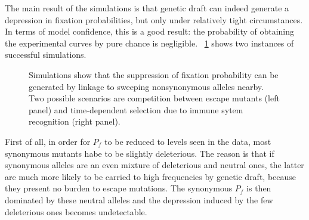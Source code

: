 \documentclass[12pt,a4paper,notitlepage,onecolumn]{article}
\begin{document}
The main result of the simulations is that genetic draft can indeed generate a
depression in fixation probabilities, but only under relatively tight
circumstances. In terms of model confidence, this is a good result: the
probability of obtaining the experimental curves by pure chance is negligible.
\figurename~\ref{fig:simfixp} shows two instances of successful simulations.
\begin{figure}
\begin{center}
\caption{Simulations show that the suppression of fixation probability can be
generated by linkage to sweeping nonsynonymous alleles nearby. Two possible
scenarios are competition between escape mutants (left panel) and time-dependent
selection due to immune sytem recognition (right panel).}
\label{fig:simfixp}
\end{center}
\end{figure}

First of all, in order for $P_f$ to be reduced to levels seen in the data, most
synonymous mutants habe to be slightly deleterious. The reason is that if
synonymous alleles are an even mixture of deleterious and neutral ones, the
latter are much more likely to be carried to high frequencies by genetic draft,
because they present no burden to escape mutations. The synonymous $P_f$ is then
dominated by these neutral alleles and the depression induced by the few
deleterious ones becomes undetectable.
\end{document}
